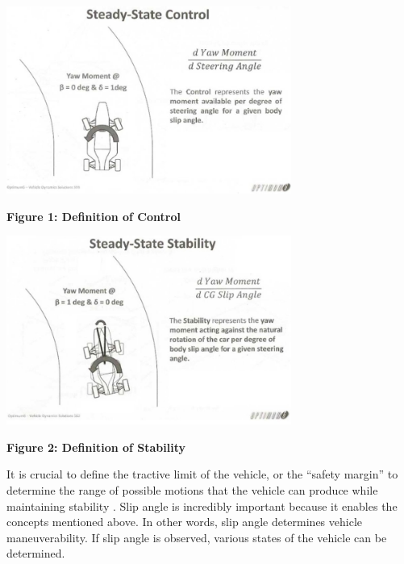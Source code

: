 \documentclass[12pt]{article}
\begin{document}
        \begin{center}
            \vspace{0.5cm}

            \includegraphics[width=0.7\textwidth]{resources/Defining-of-control-Claude-Rouelle-Applied-VD-seminar.png}

            \vspace{0.5cm}

            \textbf{Figure 1: Definition of Control} \autocite{MMM}
            \label{control}
        
        \end{center}

        \begin{center}
            \vspace{0.5cm}

            \includegraphics[width=0.7\textwidth]{resources/Defining-of-stability-Claude-Rouelle-Applied-VD-seminar.png}

            \vspace{0.5cm}

            \textbf{Figure 2: Definition of Stability} \autocite{MMM}
            \label{stability}
        
        \end{center}

        It is crucial to define the tractive limit of the vehicle, or the “safety margin” to determine the range of 
        possible motions that the vehicle can produce while maintaining stability \autocite{MMM}. Slip angle is incredibly important 
        because it enables the concepts mentioned above. In other words, slip angle determines vehicle maneuverability. If 
        slip angle is observed, various states of the vehicle can be determined. 
\end{document}

